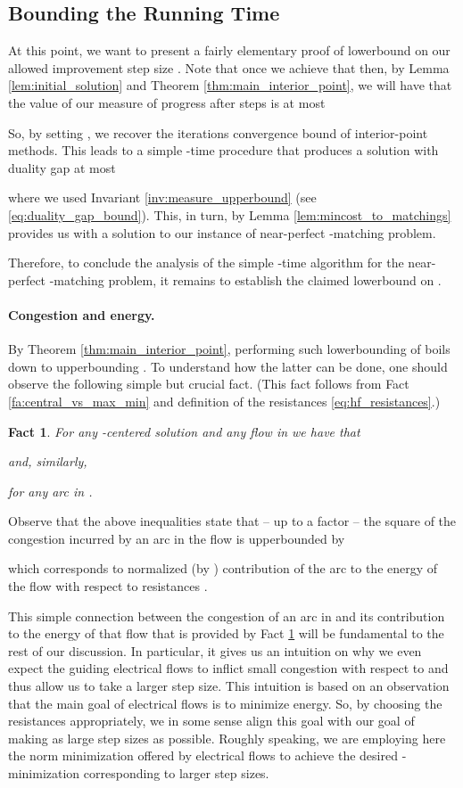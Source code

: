 \documentclass[11pt, letterpaper]{article}
\newtheorem{fact}[theorem]{Fact}
\begin{document}
\subsection{Bounding the Running Time}


At this point, we want to present a fairly elementary proof of  lowerbound on our allowed improvement step size . Note that once we achieve that then, by Lemma \ref{lem:initial_solution} and Theorem \ref{thm:main_interior_point}, we will have that the value of our measure of progress  after  steps is at most

So, by setting , we recover the  iterations convergence bound of interior-point methods. This leads to a simple -time procedure that produces a solution with duality gap at most 

where we used Invariant \ref{inv:measure_upperbound} (see \eqref{eq:duality_gap_bound}). This, in turn, by Lemma \ref{lem:mincost_to_matchings} provides us with a solution to our instance of near-perfect -matching problem. 

Therefore, to conclude the analysis of the simple -time algorithm for the near-perfect -matching problem, it remains to establish the claimed lowerbound on . 

\paragraph{Congestion and energy.} By Theorem \ref{thm:main_interior_point}, performing such lowerbounding of  boils down to upperbounding . To understand how the latter can be done, one should observe the following simple but crucial fact. (This fact follows from Fact \ref{fa:central_vs_max_min} and definition of the resistances  \eqref{eq:hf_resistances}.)


\begin{fact}
\label{fa:rho_vs_rt}
For any -centered solution  and any flow  in  we have that

and, similarly,

for any arc  in . 
\end{fact}

Observe that the above inequalities state that -- up to a  factor -- the square of the congestion  incurred by an arc  in the flow  is upperbounded by

which corresponds to normalized (by )  contribution of the arc  to the energy  of the flow  with respect to resistances .

This simple connection between the congestion of an arc in  and its contribution to the energy of that flow that is provided by Fact \ref{fa:rho_vs_rt} will be fundamental to the rest of our discussion. In particular, it gives us an intuition on why we even expect the guiding electrical flows  to inflict small congestion with respect to  and thus allow us to take a larger step size. This intuition is based on an observation that the main goal of electrical flows is to minimize energy. So, by choosing the resistances appropriately, we in some sense align this goal with our goal of making as large step sizes as possible. Roughly speaking, we are employing here the  norm minimization offered by electrical flows to achieve the desired -minimization corresponding to larger step sizes. 
\end{document}
